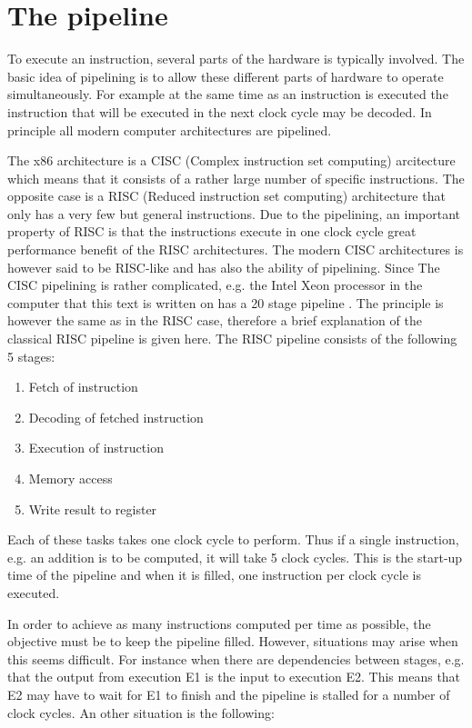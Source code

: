 \section{The pipeline}
To execute an instruction, several parts of the hardware is typically
involved. The basic idea of pipelining is to allow these different
parts of hardware to operate simultaneously. For example at the same
time as an instruction is executed the instruction that will be
executed in the next clock cycle may be decoded. In principle all
modern computer architectures are pipelined.

The x86 architecture is a CISC (Complex instruction set computing)
arcitecture which means that it consists of a rather large number of
specific instructions. The opposite case is a RISC (Reduced
instruction set computing) architecture that only has a very few but
general instructions. Due to the pipelining, an important property of
RISC is that the instructions execute in one clock cycle great
performance benefit of the RISC architectures. The modern CISC
architectures is however said to be RISC-like and has also the ability
of pipelining. Since The CISC pipelining is rather complicated,
e.g. the Intel Xeon processor in the computer that this text is
written on has a 20 stage pipeline \cite{intel-xeon}. The principle is
however the same as in the RISC case, therefore a brief explanation of
the classical RISC pipeline is given here. The RISC pipeline consists
of the following 5 stages:

\begin{enumerate}
  \item Fetch of instruction 
  \item Decoding of fetched instruction
  \item Execution of instruction
  \item Memory access
  \item Write result to register
\end{enumerate}

Each of these tasks takes one clock cycle to perform. Thus if a single
instruction, e.g. an addition is to be computed, it will take 5 clock
cycles. This is the start-up time of the pipeline and when it is
filled, one instruction per clock cycle is executed. 

In order to achieve as many instructions computed per time as
possible, the objective must be to keep the pipeline filled. However,
situations may arise when this seems difficult. For instance when
there are dependencies between stages, e.g. that the output from
execution E1 is the input to execution E2. This means that E2 may have
to wait for E1 to finish and the pipeline is stalled for a number of
clock cycles. An other situation is the following:

